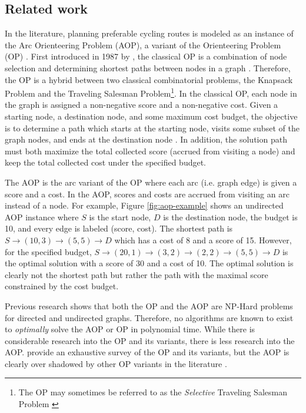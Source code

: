 \documentclass[honors]{union-cs-thesis}
\begin{document}
\subsection{Related work} \label{relatedwork}
In the literature, planning preferable cycling routes is modeled as an instance of the Arc Orienteering Problem (AOP), a variant of the Orienteering Problem (OP) \cite{souffriau2011planning}. First introduced in 1987 by \citeauthor{golden1987orienteering}, the classical OP is a combination of node selection and determining shortest paths between nodes in a graph \cite{golden1987orienteering}. Therefore, the OP is a hybrid between two classical combinatorial problems, the Knapsack Problem and the Traveling Salesman Problem\footnote{The OP may sometimes be referred to as the \emph{Selective} Traveling Salesman Problem \cite{laporte1990selective}}. In the classical OP, each node in the graph is assigned a non-negative score and a non-negative cost. Given a starting node, a destination node, and some maximum cost budget, the objective is to determine a path which starts at the starting node, visits some subset of the graph nodes, and ends at the destination node \cite{gunawan2016orienteering}. In addition, the solution path must both maximize the total collected score (accrued from visiting a node) and keep the total collected cost under the specified budget.

The AOP is the arc variant of the OP where each arc (i.e. graph edge) is given a score and a cost. In the AOP, scores and costs are accrued from visiting an arc instead of a node. For example, Figure \ref{fig:aop-example} shows an undirected AOP instance where $S$ is the start node, $D$ is the destination node, the budget is 10, and every edge is labeled (score, cost). The shortest path is $S \rightarrow (10,3) \rightarrow (5,5) \rightarrow D$ which has a cost of 8 and a score of 15. However, for the specified budget, $S \rightarrow (20,1) \rightarrow (3,2) \rightarrow (2,2) \rightarrow (5,5) \rightarrow D$ is the optimal solution with a score of 30 and a cost of 10. The optimal solution is clearly not the shortest path but rather the path with the maximal score constrained by the cost budget.

Previous research shows that both the OP and the AOP are NP-Hard problems for directed and undirected graphs. Therefore, no algorithms are known to exist to \emph{optimally} solve the AOP or OP in polynomial time. While there is considerable research into the OP and its variants, there is less research into the AOP. \citeauthor{gunawan2016orienteering} provide an exhaustive survey of the OP and its variants, but the AOP is clearly over shadowed by other OP variants in the literature \cite{gunawan2016orienteering}.
\end{document}
